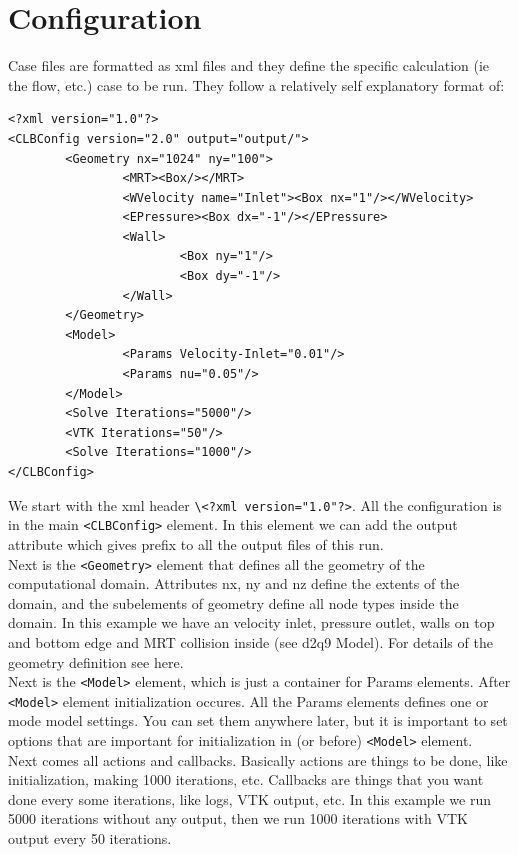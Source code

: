 \documentclass[12pt,a4paper]{report}
\begin{document}
\section{Configuration}
Case files are formatted as xml files and they define the specific calculation (ie the flow, etc.) case to be run. They follow a relatively self explanatory format of:
\begin{lstlisting}
<?xml version="1.0"?>
<CLBConfig version="2.0" output="output/">
        <Geometry nx="1024" ny="100">
                <MRT><Box/></MRT>
                <WVelocity name="Inlet"><Box nx="1"/></WVelocity>
                <EPressure><Box dx="-1"/></EPressure>
                <Wall>
                        <Box ny="1"/>
                        <Box dy="-1"/>
                </Wall>
        </Geometry>
        <Model>
                <Params Velocity-Inlet="0.01"/>
                <Params nu="0.05"/>
        </Model>
        <Solve Iterations="5000"/>
        <VTK Iterations="50"/>
        <Solve Iterations="1000"/>
</CLBConfig>
\end{lstlisting}
We start with the xml header \lstinline$\<?xml version="1.0"?>$. All the configuration is in the main \lstinline$<CLBConfig>$ element. In this element we can add the output attribute which gives prefix to all the output files of this run.\\

Next is the \lstinline$<Geometry>$ element that defines all the geometry of the computational domain. Attributes nx, ny and nz define the extents of the domain, and the subelements of geometry define all node types inside the domain. In this example we have an velocity inlet, pressure outlet, walls on top and bottom edge and MRT collision inside (see d2q9 Model). For details of the geometry definition see here.\\

Next is the \lstinline$<Model>$ element, which is just a container for Params elements. After \lstinline$<Model>$ element initialization occures. All the Params elements defines one or mode model settings. You can set them anywhere later, but it is important to set options that are important for initialization in (or before) \lstinline$<Model>$ element.\\

Next comes all actions and callbacks. Basically actions are things to be done, like initialization, making 1000 iterations, etc. Callbacks are things that you want done every some iterations, like logs, VTK output, etc. In this example we run 5000 iterations without any output, then we run 1000 iterations with VTK output every 50 iterations.
\end{document}
